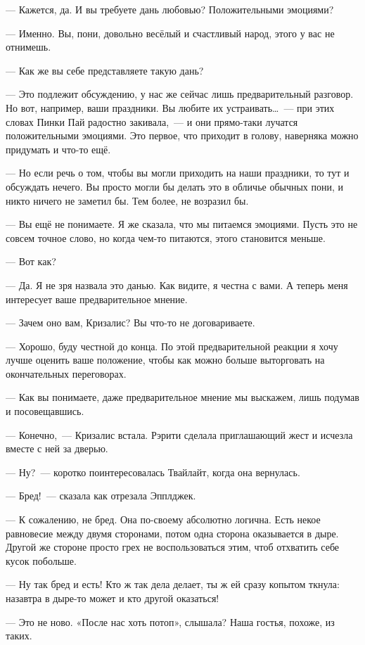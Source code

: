 \documentclass[twoside,a5paper,12pt]{extbook}
\begin{document}
— Кажется, да. И вы требуете дань любовью? Положительными эмоциями?

— Именно. Вы, пони, довольно весёлый и счастливый народ, этого у вас не отнимешь.

— Как же вы себе представляете такую дань?

— Это подлежит обсуждению, у нас же сейчас лишь предварительный разговор. Но вот, например, ваши праздники. Вы любите их устраивать… — при этих словах Пинки Пай радостно закивала, — и они прямо-таки лучатся положительными эмоциями. Это первое, что приходит в голову, наверняка можно придумать и что-то ещё.

— Но если речь о том, чтобы вы могли приходить на наши праздники, то тут и обсуждать нечего. Вы просто могли бы делать это в обличье обычных пони, и никто ничего не заметил бы. Тем более, не возразил бы.

— Вы ещё не понимаете. Я же сказала, что мы питаемся эмоциями. Пусть это не совсем точное слово, но когда чем-то питаются, этого становится меньше.

— Вот как?

— Да. Я не зря назвала это данью. Как видите, я честна с вами. А теперь меня интересует ваше предварительное мнение.

— Зачем оно вам, Кризалис? Вы что-то не договариваете.

— Хорошо, буду честной до конца. По этой предварительной реакции я хочу лучше оценить ваше положение, чтобы как можно больше выторговать на окончательных переговорах.

— Как вы понимаете, даже предварительное мнение мы выскажем, лишь подумав и посовещавшись.

— Конечно, — Кризалис встала. Рэрити сделала приглашающий жест и исчезла вместе с ней за дверью.

— Ну? — коротко поинтересовалась Твайлайт, когда она вернулась.

— Бред! — сказала как отрезала Эпплджек.

— К сожалению, не бред. Она по-своему абсолютно логична. Есть некое равновесие между двумя сторонами, потом одна сторона оказывается в дыре. Другой же стороне просто грех не воспользоваться этим, чтоб отхватить себе кусок побольше.

— Ну так бред и есть! Кто ж так дела делает, ты ж ей сразу копытом ткнула: назавтра в дыре-то может и кто другой оказаться!

— Это не ново. «После нас хоть потоп», слышала? Наша гостья, похоже, из таких.
\end{document}
